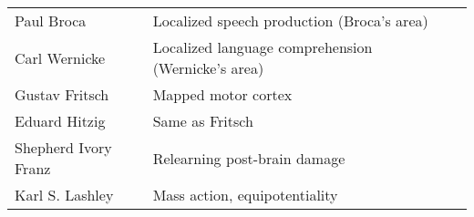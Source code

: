 \begin{landscape}
\begin{table}[h]
\begin{tabular}{p{5.2cm}p{9.5cm}p{3cm}}
            Paul Broca            & Localized speech production (Broca's area)                                 \\
            Carl Wernicke         & Localized language comprehension (Wernicke's area)                         \\
            Gustav Fritsch        & Mapped motor cortex                                                        \\
            Eduard Hitzig         & Same as Fritsch                                                            \\
            Shepherd Ivory Franz  & Relearning post-brain damage                                               \\
            Karl S. Lashley       & Mass action, equipotentiality                                              \\
            \bottomrule
        \end{tabular}

    \end{table}
    \vfill

\end{landscape}